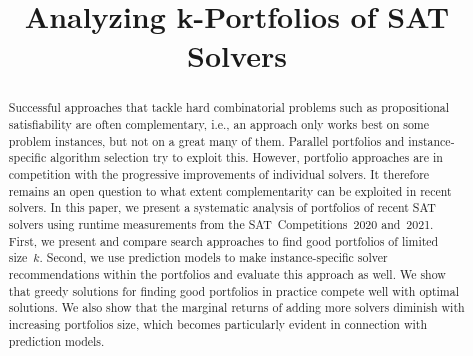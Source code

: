 \documentclass[conference]{IEEEtran}
\begin{document}
\title{Analyzing k-Portfolios of SAT Solvers}

\author{
\and
{}
}

\maketitle

\begin{abstract}
Successful approaches that tackle hard combinatorial problems such as propositional satisfiability are often complementary, i.e., an approach only works best on some problem instances, but not on a great many of them. 
Parallel portfolios and instance-specific algorithm selection try to exploit this.
However, portfolio approaches are in competition with the progressive improvements of individual solvers.
It therefore remains an open question to what extent complementarity can be exploited in recent solvers. 
In this paper, we present a systematic analysis of portfolios of recent SAT solvers using runtime measurements from the SAT~Competitions~2020 and~2021. 
First, we present and compare search approaches to find good portfolios of limited size~$k$.
Second, we use prediction models to make instance-specific solver recommendations within the portfolios and evaluate this approach as well. %
We show that greedy solutions for finding good portfolios in practice compete well with optimal solutions. 
We also show that the marginal returns of adding more solvers diminish with increasing portfolios size, which becomes particularly evident in connection with prediction models. 
\end{abstract}
\end{document}
